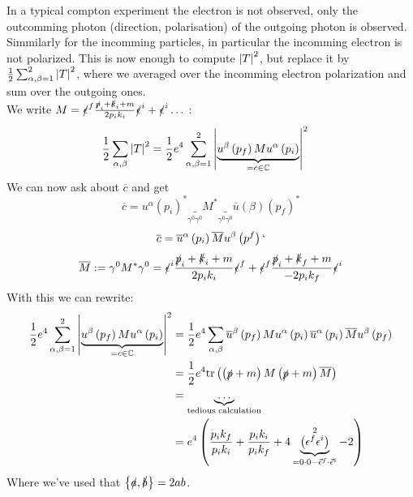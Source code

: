 \documentclass{report}
\begin{document}
In a typical compton experiment the electron is not observed, only the outcomming photon (direction, polarisation) of the outgoing photon is observed. Simmilarly for the incomming particles, in particular the incomming electron is not polarized. This is now enough to compute $\abs{T} ^2$, but replace it by $\frac{1}{2} \sum_{\alpha,\beta =1}^{2} \abs{T} ^2 $, where we averaged over the incomming electron polarization and sum over the outgoing ones. \\
We write $M = \slashed{\epsilon}^{f} \frac{\slashed{p}_i + \slashed{k}_i + m}{2 p_i k_i} \slashed{\epsilon}^{i} + \slashed{\epsilon}^{i} \ldots$ :
\begin{align*}
  \frac{1}{2} \sum_{\alpha, \beta}^{} \abs{T} ^2 &= 
  \frac{1}{2} e^{4} \sum_{\alpha,\beta=1}^{2} \abs{ \underbrace{ u^{\beta} \left( p_f \right) M u^{\alpha} \left( p_i \right)}_{= c \in \mathbb{C}} }^2 
\end{align*}
We can now ask about $\overline{c} $ and get \[
  \overline{c} = u^{\alpha} \left( p_i \right) ^{*} \underbrace{}_{\gamma^{0} \gamma^{0} }  M^{*} \underbrace{}_{\gamma^{0} \gamma^{0} }  \overline{u}\left( \beta \right) \left( p_f \right) ^{*} 
\] \[
\overline{c} = \overline{u}^{\alpha} \left( p_i \right) \overline{M} u^{\beta} \left( p^{f}  \right) `
\] 
\[
\overline{M} := \gamma^{0} M^{*} \gamma^{0}  = 
\slashed{\epsilon}^{i} \frac{\slashed{p}_i + \slashed{k}_i + m}{2 p_i k_i} \slashed{\epsilon}^{f} +
\slashed{\epsilon}^{f} \frac{\slashed{p}_i + \slashed{k}_f + m}{-2 p_i k_f} \slashed{\epsilon}^{i}
\] 
With this we can rewrite:
\begin{align*}
  \frac{1}{2} e^{4} \sum_{\alpha,\beta=1}^{2} \abs{ \underbrace{ u^{\beta} \left( p_f \right) M u^{\alpha} \left( p_i \right)}_{= c \in \mathbb{C}} }^2 
  &= \frac{1}{2} e^{4} \sum_{\alpha, \beta}^{} \overline{u}^{\beta} \left( p_f \right) M u^{\alpha} \left( p_i \right) \overline{u}^{\alpha} \left( p_i \right) \overline{M} u^{\beta} \left( p_f \right)    \\
  &= \frac{1}{2} e^{4} \text{tr}\left(\left( \slashed{p} + m \right)    M \left( \slashed{p} + m \right) \overline{M} \right)  \\
  &= \underbrace{\ldots}_{\text{tedious calculation}}  \\
  &=  e^{4} \left( \frac{p_i k_f}{p_i k_i} + \frac{p_i k_i}{p_i k_f} + 4 \underbrace{ \left( \epsilon^{f} \epsilon^{i}  \right)}_{= 0\cdot 0 - \vec{\epsilon}^{f} \cdot \vec{\epsilon}^{i} } ^2 - 2 \right) 
\end{align*}
Where we've used that $\left\{ \slashed{a}, \slashed{b} \right\} = 2ab$. \\
\end{document}
